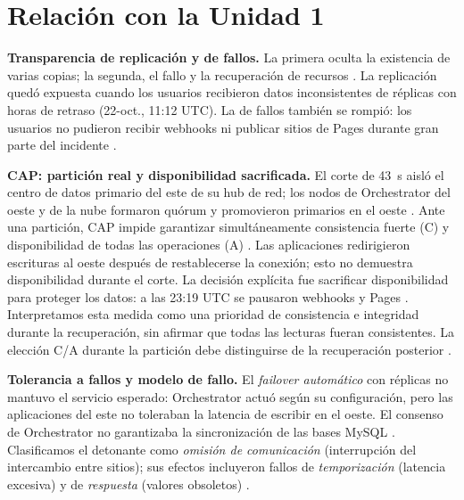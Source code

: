 \documentclass[11pt,a4paper]{article}
\begin{document}
\section{Relaci\'on con la Unidad 1}
\textbf{Transparencia de replicaci\'on y de fallos.} La primera oculta la existencia de varias copias; la segunda, el fallo y la recuperaci\'on de recursos \cite{vansteen2023}. La replicaci\'on qued\'o expuesta cuando los usuarios recibieron datos inconsistentes de r\'eplicas con horas de retraso (22-oct., 11:12 UTC). La de fallos tambi\'en se rompi\'o: los usuarios no pudieron recibir webhooks ni publicar sitios de Pages durante gran parte del incidente \cite{github2018}.

\textbf{CAP: partici\'on real y disponibilidad sacrificada.} El corte de 43~s aisl\'o el centro de datos primario del este de su hub de red; los nodos de Orchestrator del oeste y de la nube formaron qu\'orum y promovieron primarios en el oeste \cite{github2018}. Ante una partici\'on, CAP impide garantizar simult\'aneamente consistencia fuerte (C) y disponibilidad de todas las operaciones (A) \cite{gilbert2002}. Las aplicaciones redirigieron escrituras al oeste después de restablecerse la conexión; esto no demuestra disponibilidad durante el corte. La decisi\'on expl\'icita fue sacrificar disponibilidad para proteger los datos: a las 23:19 UTC se pausaron webhooks y Pages \cite{github2018}. Interpretamos esta medida como una prioridad de consistencia e integridad durante la recuperaci\'on, sin afirmar que todas las lecturas fueran consistentes. La elección C/A durante la partición debe distinguirse de la recuperación posterior \cite{brewer2012}.

\textbf{Tolerancia a fallos y modelo de fallo.} El \emph{failover autom\'atico} con r\'eplicas no mantuvo el servicio esperado: Orchestrator actu\'o seg\'un su configuraci\'on, pero las aplicaciones del este no toleraban la latencia de escribir en el oeste. El consenso de Orchestrator no garantizaba la sincronizaci\'on de las bases MySQL \cite{github2018}. Clasificamos el detonante como \emph{omisi\'on de comunicaci\'on} (interrupci\'on del intercambio entre sitios); sus efectos incluyeron fallos de \emph{temporizaci\'on} (latencia excesiva) y de \emph{respuesta} (valores obsoletos) \cite{vansteen2023}.
\end{document}
